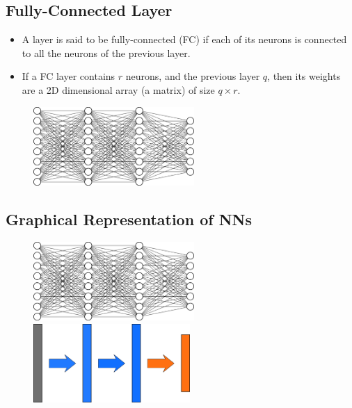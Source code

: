 \documentclass{book}
\begin{document}
\subsection{Fully-Connected Layer}

\begin{itemize}
\item A layer is said to be fully-connected (FC) if each of its neurons is connected to all the neurons of the previous layer.
\item If a FC layer contains $r$ neurons, and the previous layer $q$, then its weights are a 2D dimensional array (a matrix) of size $q \times r$.
\end{itemize}

\begin{figure}[h]
    \centering
    \includegraphics[height=3cm]{mini_reseau3_bis}
\end{figure}

\subsection{Graphical Representation of NNs}

\begin{figure}[h]
    \centering
    \begin{minipage}{.5\textwidth}
        \centering
        \includegraphics[height=3cm]{mini_reseau3_bis}
    \end{minipage}
    \begin{minipage}{.5\textwidth}
        \centering
        \includegraphics[height=3cm]{nn_representation3}
    \end{minipage}
\end{figure}
\end{document}
